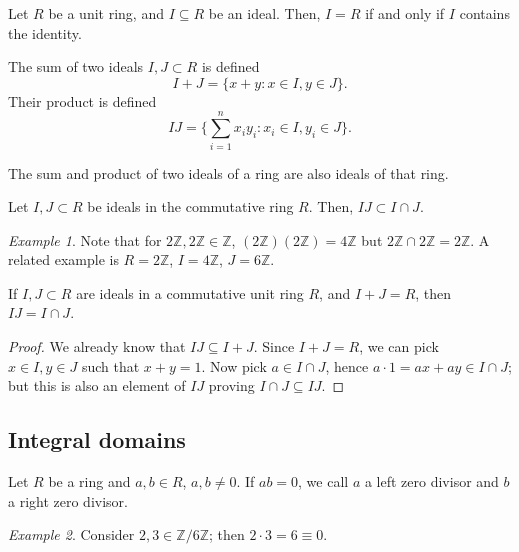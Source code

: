 \documentclass[11pt]{article}
\newcommand{\Z}{\mathbb{Z}}
\theoremstyle{definition}
\theoremstyle{remark}
\newtheorem*{example}{Example}
\numberwithin{equation}{section}
\begin{document}
    \begin{lemma}
        Let $R$ be a unit ring, and $I \subseteq R$ be an ideal. Then, $I = R$ if and
        only if $I$ contains the identity.
    \end{lemma}

    \begin{definition}
        The sum of two ideals $I, J \subset R$ is defined \[
            I + J = \{x + y: x \in I, y \in J\}.
        \] Their product is defined \[
            IJ = \{\sum_{i = 1}^n x_iy_i: x_i \in I, y_i \in J\}.
        \]
    \end{definition}

    \begin{lemma}
        The sum and product of two ideals of a ring are also ideals of that ring.
    \end{lemma}

    \begin{lemma}
        Let $I, J \subset R$ be ideals in the commutative ring $R$. Then, $IJ \subset
        I \cap J$.
    \end{lemma}
    \begin{example}
        Note that for $2\Z, 2\Z \in \Z$, $(2\Z)(2\Z) = 4\Z$ but $2\Z \cap 2\Z = 2\Z$.
        A related example is $R = 2\Z$, $I = 4\Z$, $J = 6\Z$.
    \end{example}

    \begin{lemma}
        If $I, J \subset R$ are ideals in a commutative unit ring $R$, and $I + J =
        R$, then $IJ = I \cap J$.
    \end{lemma}
    \begin{proof}
        We already know that $IJ \subseteq I + J$. Since $I + J = R$, we can pick $x
        \in I, y \in J$ such that $x + y = 1$. Now pick $a \in I\cap J$, hence
        $a\cdot 1 = ax + ay \in I \cap J$; but this is also an element of $IJ$
        proving $I \cap J \subseteq IJ$.
    \end{proof}
    
    \subsection{Integral domains}
    
    \begin{definition}
        Let $R$ be a ring and $a, b \in R$, $a, b \neq 0$. If $ab = 0$, we call $a$ a
        left zero divisor and $b$ a right zero divisor.
    \end{definition}
    \begin{example}
        Consider $2, 3 \in \Z/6\Z$; then $2\cdot 3 = 6 \equiv 0$.
    \end{example}
\end{document}

